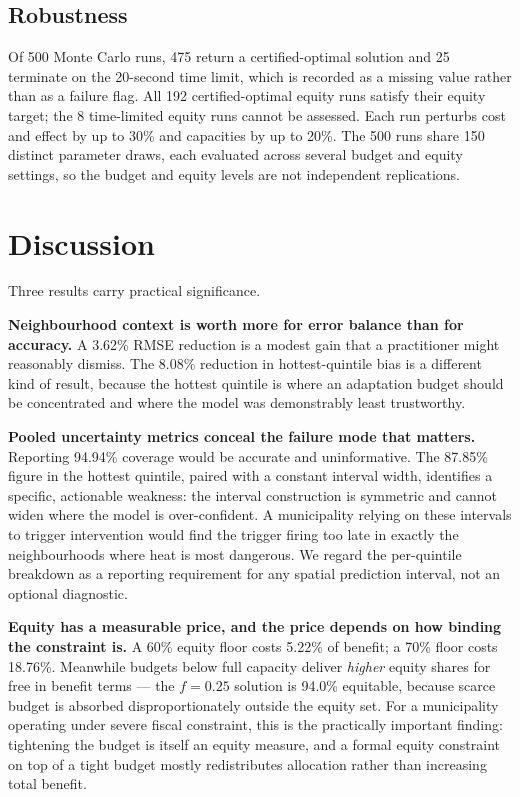 \documentclass[conference]{IEEEtran}
\begin{document}
\subsection{Robustness}\label{g.-robustness}

Of 500 Monte Carlo runs, 475 return a certified-optimal solution and 25 terminate on the 20-second
time limit, which is recorded as a missing value rather than as a failure flag. All 192
certified-optimal equity runs satisfy their equity target; the 8 time-limited equity runs cannot be
assessed. Each run perturbs cost and effect by up to \textpm{}30\% and capacities by up to \textpm{}20\%. The 500 runs
share 150 distinct parameter draws, each evaluated across several budget and equity settings, so the
budget and equity levels are not independent replications.

\section{Discussion}\label{vii.-discussion}

Three results carry practical significance.

\textbf{Neighbourhood context is worth more for error balance than for accuracy.} A 3.62\% RMSE reduction is
a modest gain that a practitioner might reasonably dismiss. The 8.08\% reduction in hottest-quintile
bias is a different kind of result, because the hottest quintile is where an adaptation budget should
be concentrated and where the model was demonstrably least trustworthy.

\textbf{Pooled uncertainty metrics conceal the failure mode that matters.} Reporting 94.94\% coverage would
be accurate and uninformative. The 87.85\% figure in the hottest quintile, paired with a constant
interval width, identifies a specific, actionable weakness: the interval construction is symmetric
and cannot widen where the model is over-confident. A municipality relying on these intervals to
trigger intervention would find the trigger firing too late in exactly the neighbourhoods where
heat is most dangerous. We regard the per-quintile breakdown as a reporting requirement for any
spatial prediction interval, not an optional diagnostic.

\textbf{Equity has a measurable price, and the price depends on how binding the constraint is.} A 60\%
equity floor costs 5.22\% of benefit; a 70\% floor costs 18.76\%. Meanwhile budgets below full capacity
deliver \emph{higher} equity shares for free in benefit terms --- the \(f = 0.25\) solution is 94.0\% equitable,
because scarce budget is absorbed disproportionately outside the equity set. For a municipality
operating under severe fiscal constraint, this is the practically important finding: tightening the
budget is itself an equity measure, and a formal equity constraint on top of a tight budget mostly
redistributes allocation rather than increasing total benefit.
\end{document}
